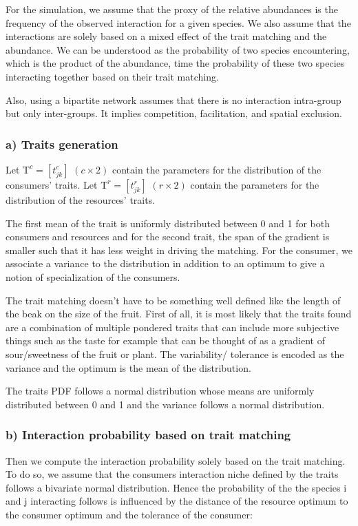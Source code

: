 \documentclass{article}
\begin{document}
For the simulation, we assume that the proxy of the relative abundances is the frequency of the observed interaction for a given species. We also assume that the interactions are solely based on a mixed effect of the trait matching and the abundance. We can be understood as the probability of two species encountering, which is the product of the abundance, time the probability of these two species interacting together based on their trait matching.

Also, using a bipartite network assumes that there is no interaction intra-group but only inter-groups. It implies competition, facilitation, and spatial exclusion.




\subsubsection{a) Traits generation}
Let $\textrm{T}^c = [t^c_{jk}]$ $(c \times 2)$ contain the parameters for the distribution of the consumers' traits. 
Let $\textrm{T}^r = [t^r_{jk}]$ $(r \times 2)$ contain the parameters for the distribution of the resources' traits. 

The first mean of the trait is uniformly distributed between 0 and 1 for both consumers and resources and for the second trait, the span of the gradient is smaller such that it has less weight in driving the matching. 
For the consumer, we associate a variance to the distribution in addition to an optimum to give a notion of specialization of the consumers.

The trait matching doesn't have to be something well defined like the length of the beak on the size of the fruit. First of all, it is most likely that the traits found are a combination of multiple pondered traits that can include more subjective things such as the taste for example that can be thought of as a gradient of sour/sweetness of the fruit or plant.
The variability/ tolerance is encoded as the variance and the optimum is the mean of the distribution.

The traits PDF follows a normal distribution whose means are uniformly distributed between 0 and 1 and the variance follows a normal distribution.




\subsubsection{b) Interaction probability based on trait matching}
Then we compute the interaction probability  solely based on the trait matching. To do so, we assume that the consumers interaction niche defined by the traits follows a bivariate normal distribution. Hence the probability of the the species i and j interacting follows is influenced by the distance of the resource optimum to the consumer optimum and the tolerance of the consumer:
\end{document}
